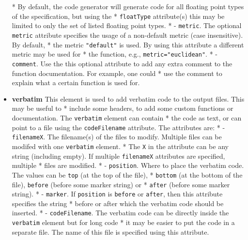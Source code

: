\documentclass[10pt, a4paper]{article}
\begin{document}
\begin{itemize}
 *          By default, the code generator will generate code for all floating point types of the specification, but using the 
 *          {\tt floatType} attribute(s) this may be limited to only the set of listed floating point types.
 *        - {\tt metric}. The optional {\tt metric} attribute specifies the usage of a non-default metric (case insensitive). By default,
 *          the metric {\tt "default"} is used. By using this attribute a different metric may be used for
 *          the function, e.g., {\tt metric="euclidean"}.
 *        - {\tt comment}. Use the this optional attribute to add any extra comment to the function documentation. For example, one could
 *          use the comment to explain what a certain function is used for.
\item {\bf verbatim} This element is used to add verbatim code to the output files. This may be useful to
 *     include some headers, to add some custom functions or documentation. The {\tt verbatim} element can contain
 *     the code as text, or can point to a file using the {\tt codeFilename} attribute. The attributes are:
 *        - {\tt filenameX}. The filename(s) of the files to modify. Multiple files can be modifed with one {\tt verbatim} element.
 *        The {\tt X} in the attribute can be any string (including empty). If multiple {\tt filenameX} attributes are specified, multiple
 *        files are modified.
 *        - {\tt position}. Where to place the verbatim code. The values can be {\tt top} (at the top of the file), 
 *           {\tt bottom} (at the bottom of the file), {\tt before} (before some marker string) or
 *           {\tt after} (before some marker string).
 *        - {\tt marker}. If {\tt position} is {\tt before} or {\tt after}, then this attribute specifies the string
 *           before or after which the verbatim code should be inserted.
 *        - {\tt codeFilename}. The verbatim code can be directly inside the {\tt verbatim} element but for long code
 *           it may be easier to put the code in a separate file. The name of this file is specified using this attribute.
 \end{itemize}
 
\end{document}
